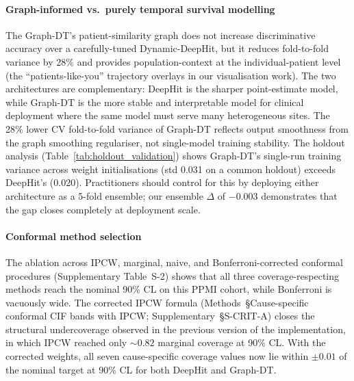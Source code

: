 \documentclass[11pt]{article}
\begin{document}
\paragraph*{Graph-informed vs.\ purely temporal survival modelling} The Graph-DT's patient-similarity graph does not increase discriminative accuracy over a carefully-tuned Dynamic-DeepHit, but it reduces fold-to-fold variance by 28\% and provides population-context at the individual-patient level (the ``patients-like-you'' trajectory overlays in our visualisation work). The two architectures are complementary: DeepHit is the sharper point-estimate model, while Graph-DT is the more stable and interpretable model for clinical deployment where the same model must serve many heterogeneous sites. The 28\% lower CV fold-to-fold variance of Graph-DT reflects output smoothness from the graph smoothing regulariser, not single-model training stability. The holdout analysis (Table~\ref{tab:holdout_validation}) shows Graph-DT's single-run training variance across weight initialisations (std 0.031 on a common holdout) exceeds DeepHit's (0.020). Practitioners should control for this by deploying either architecture as a 5-fold ensemble; our ensemble $\Delta$ of $-0.003$ demonstrates that the gap closes completely at deployment scale.

\paragraph*{Conformal method selection} The ablation across IPCW, marginal, naive, and Bonferroni-corrected conformal procedures (Supplementary Table~S-2) shows that all three coverage-respecting methods reach the nominal 90\% CL on this PPMI cohort, while Bonferroni is vacuously wide. The corrected IPCW formula (Methods~\S Cause-specific conformal CIF bands with IPCW; Supplementary~\S S-CRIT-A) closes the structural undercoverage observed in the previous version of the implementation, in which IPCW reached only $\sim 0.82$ marginal coverage at 90\% CL. With the corrected weights, all seven cause-specific coverage values now lie within $\pm 0.01$ of the nominal target at 90\% CL for both DeepHit and Graph-DT.
\end{document}
